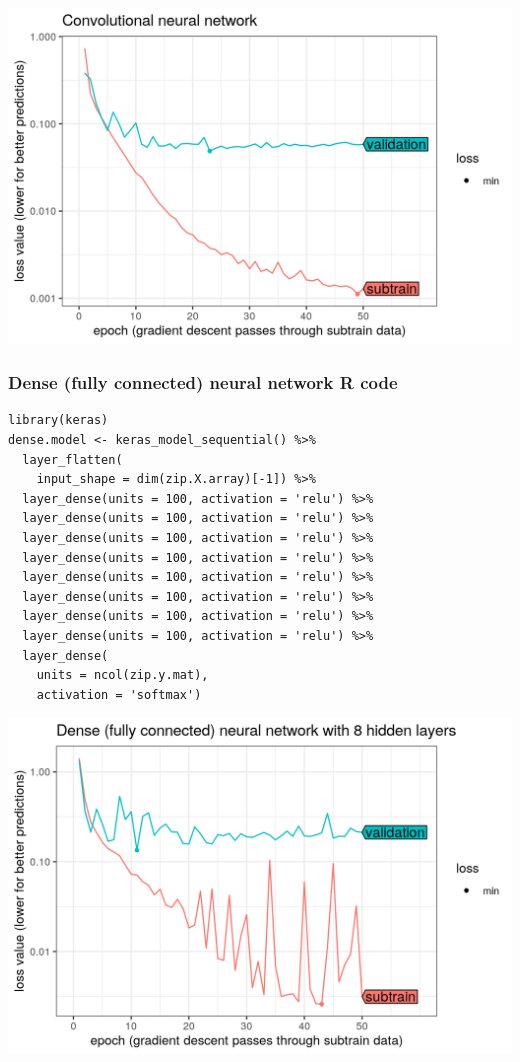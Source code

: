 \documentclass{beamer}
\begin{document}
\begin{frame}
  \includegraphics[width=\textwidth]{figure-validation-loss-conv}
\end{frame}
 
\begin{frame}[fragile]
  \frametitle{Dense (fully connected) neural network R code}

\begin{verbatim}
library(keras)
dense.model <- keras_model_sequential() %>%
  layer_flatten(
    input_shape = dim(zip.X.array)[-1]) %>%
  layer_dense(units = 100, activation = 'relu') %>% 
  layer_dense(units = 100, activation = 'relu') %>% 
  layer_dense(units = 100, activation = 'relu') %>% 
  layer_dense(units = 100, activation = 'relu') %>%
  layer_dense(units = 100, activation = 'relu') %>%
  layer_dense(units = 100, activation = 'relu') %>% 
  layer_dense(units = 100, activation = 'relu') %>%   
  layer_dense(units = 100, activation = 'relu') %>% 
  layer_dense(
    units = ncol(zip.y.mat), 
    activation = 'softmax')
\end{verbatim}

\end{frame}
 
\begin{frame}
  \includegraphics[width=\textwidth]{figure-validation-loss-dense}
\end{frame}
 
\end{document}
